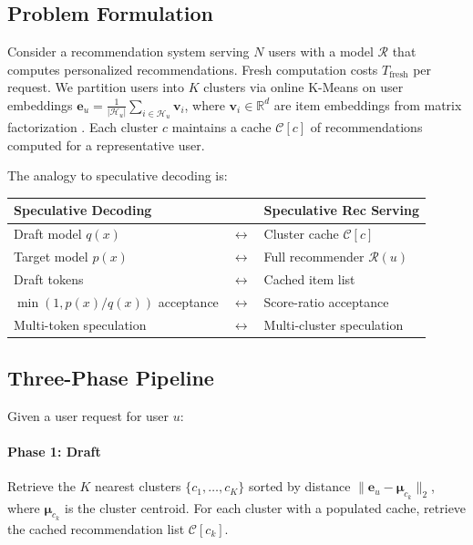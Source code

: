 \documentclass{article}
\begin{document}
\subsection{Problem Formulation}

Consider a recommendation system serving $N$ users with a model $\mathcal{R}$ that computes personalized recommendations. Fresh computation costs $T_{\text{fresh}}$ per request. We partition users into $K$ clusters via online K-Means on user embeddings $\mathbf{e}_u = \frac{1}{|\mathcal{H}_u|} \sum_{i \in \mathcal{H}_u} \mathbf{v}_i$, where $\mathbf{v}_i \in \mathbb{R}^d$ are item embeddings from matrix factorization \citep{koren2009matrix}. Each cluster $c$ maintains a cache $\mathcal{C}[c]$ of recommendations computed for a representative user.

The analogy to speculative decoding is:
\begin{center}
\small
\begin{tabular}{lll}
\toprule
\textbf{Speculative Decoding} & & \textbf{Speculative Rec Serving} \\
\midrule
Draft model $q(x)$ & $\longleftrightarrow$ & Cluster cache $\mathcal{C}[c]$ \\
Target model $p(x)$ & $\longleftrightarrow$ & Full recommender $\mathcal{R}(u)$ \\
Draft tokens & $\longleftrightarrow$ & Cached item list \\
$\min(1, p(x)/q(x))$ acceptance & $\longleftrightarrow$ & Score-ratio acceptance \\
Multi-token speculation & $\longleftrightarrow$ & Multi-cluster speculation \\
\bottomrule
\end{tabular}
\end{center}

\subsection{Three-Phase Pipeline}

Given a user request for user $u$:

\paragraph{Phase 1: Draft}
Retrieve the $K$ nearest clusters $\{c_1, \ldots, c_K\}$ sorted by distance $\|\mathbf{e}_u - \boldsymbol{\mu}_{c_k}\|_2$, where $\boldsymbol{\mu}_{c_k}$ is the cluster centroid. For each cluster with a populated cache, retrieve the cached recommendation list $\mathcal{C}[c_k]$.
\end{document}

